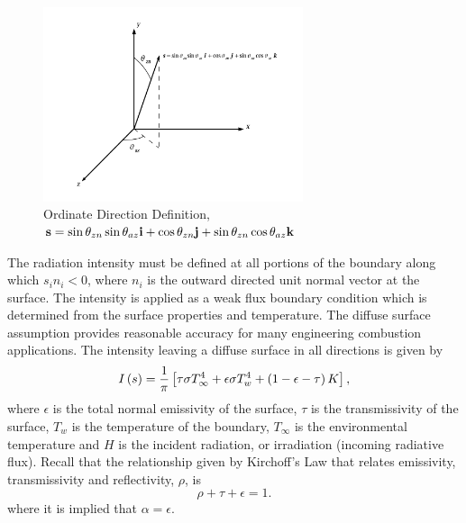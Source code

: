 \begin{figure}[ht]
\centerline{\includegraphics[width=3.0in]{images/ordinate.pdf}}
\vspace{0.1in}
\caption{Ordinate Direction Definition, \newline
         ${\bf s} = \sin \theta_{zn} \sin \theta_{az} {\bf i}
            + \cos \theta_{zn} {\bf j} 
            + \sin \theta_{zn} \cos \theta_{az} {\bf k}$}
\label{ord-dir}
\end{figure}


The radiation intensity must be defined at all portions 
of the boundary along which $s_i n_i < 0$, where $n_i$ is the 
outward directed 
unit normal vector at the surface.  The intensity is applied as a 
weak flux boundary condition which is determined from the surface 
properties and temperature.  The diffuse surface assumption 
provides reasonable accuracy for many engineering combustion 
applications.  The intensity leaving a diffuse surface in all 
directions is given by
%
\begin{equation}
  I\left(s\right) = {1 \over \pi} \left[ \tau \sigma T_\infty^4 
                  + \epsilon \sigma T_w^4
                  + \left(1 - \epsilon - \tau \right) K \right] ,
\label{intBc}
\end{equation}
%
where $\epsilon$ is the total normal emissivity of the 
surface, $\tau$ is the transmissivity of the surface, $T_w$ is the 
temperature of the boundary, $T_\infty$ is the environmental 
temperature and  $H$ is the incident radiation, or irradiation (incoming radiative flux). 
Recall that the relationship given by Kirchoff's 
Law that relates emissivity, transmissivity and reflectivity, $\rho$, is
%
\begin{equation}
  \rho + \tau + \epsilon = 1.
\end{equation}
%
where it is implied that $\alpha = \epsilon$.
